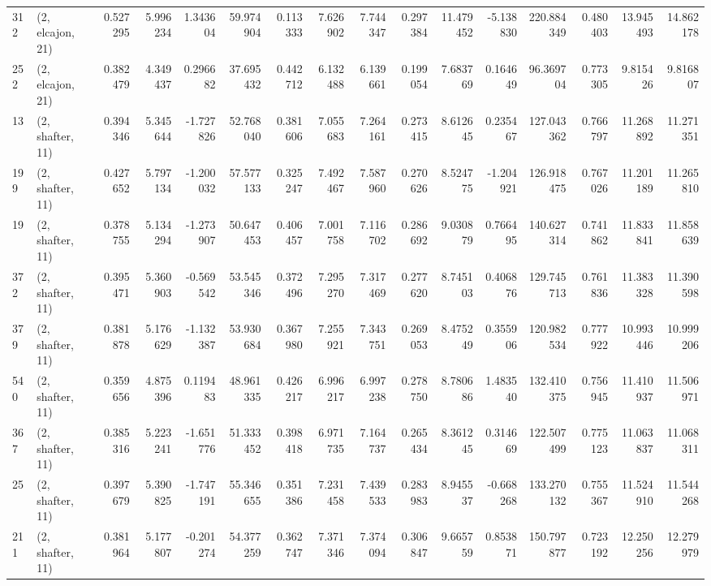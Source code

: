 \begin{tabular}{llrrrrrrrrrrrrrr}
312 &  (2, elcajon, 21) &   0.527295 &   5.996234 &   1.343604 &    59.974904 &   0.113333 &   7.626902 &   7.744347 &  0.297384 &  11.479452 &  -5.138830 &   220.884349 &  0.480403 &  13.945493 &  14.862178 \\
252 &  (2, elcajon, 21) &   0.382479 &   4.349437 &   0.296682 &    37.695432 &   0.442712 &   6.132488 &   6.139661 &  0.199054 &   7.683769 &   0.164649 &    96.369704 &  0.773305 &   9.815426 &   9.816807 \\
13  &  (2, shafter, 11) &   0.394346 &   5.345644 &  -1.727826 &    52.768040 &   0.381606 &   7.055683 &   7.264161 &  0.273415 &   8.612645 &   0.235467 &   127.043362 &  0.766797 &  11.268892 &  11.271351 \\
199 &  (2, shafter, 11) &   0.427652 &   5.797134 &  -1.200032 &    57.577133 &   0.325247 &   7.492467 &   7.587960 &  0.270626 &   8.524775 &  -1.204921 &   126.918475 &  0.767026 &  11.201189 &  11.265810 \\
19  &  (2, shafter, 11) &   0.378755 &   5.134294 &  -1.273907 &    50.647453 &   0.406457 &   7.001758 &   7.116702 &  0.286692 &   9.030879 &   0.766495 &   140.627314 &  0.741862 &  11.833841 &  11.858639 \\
372 &  (2, shafter, 11) &   0.395471 &   5.360903 &  -0.569542 &    53.545346 &   0.372496 &   7.295270 &   7.317469 &  0.277620 &   8.745103 &   0.406876 &   129.745713 &  0.761836 &  11.383328 &  11.390598 \\
379 &  (2, shafter, 11) &   0.381878 &   5.176629 &  -1.132387 &    53.930684 &   0.367980 &   7.255921 &   7.343751 &  0.269053 &   8.475249 &   0.355906 &   120.982534 &  0.777922 &  10.993446 &  10.999206 \\
540 &  (2, shafter, 11) &   0.359656 &   4.875396 &   0.119483 &    48.961335 &   0.426217 &   6.996217 &   6.997238 &  0.278750 &   8.780686 &   1.483540 &   132.410375 &  0.756945 &  11.410937 &  11.506971 \\
367 &  (2, shafter, 11) &   0.385316 &   5.223241 &  -1.651776 &    51.333452 &   0.398418 &   6.971735 &   7.164737 &  0.265434 &   8.361245 &   0.314669 &   122.507499 &  0.775123 &  11.063837 &  11.068311 \\
25  &  (2, shafter, 11) &   0.397679 &   5.390825 &  -1.747191 &    55.346655 &   0.351386 &   7.231458 &   7.439533 &  0.283983 &   8.945537 &  -0.668268 &   133.270132 &  0.755367 &  11.524910 &  11.544268 \\
211 &  (2, shafter, 11) &   0.381964 &   5.177807 &  -0.201274 &    54.377259 &   0.362747 &   7.371346 &   7.374094 &  0.306847 &   9.665759 &   0.853871 &   150.797877 &  0.723192 &  12.250256 &  12.279979 \\

\end{tabular}
